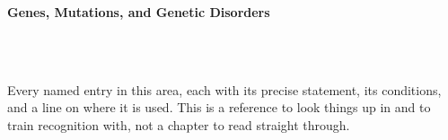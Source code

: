 



\makeindex[title={Index of This Volume},columns=2,intoc]

\begin{titlepage}\thispagestyle{empty}
\vspace*{0.14\textheight}
\noindent{\color{tiercat}\rule{\textwidth}{5pt}}\\[3pt]
\noindent{\color{bioline}\rule{\textwidth}{1pt}}\\[26pt]
\\[12pt]
\noindent\begin{minipage}{\textwidth}\raggedright
{\sffamily\bfseries\fontsize{28}{32}\selectfont\color{bioink}%
 \hyphenchar{} Genes, Mutations, and Genetic Disorders\par}\end{minipage}\\[16pt]
\noindent{\color{biogreen}\rule{\textwidth}{1.4pt}}\\[10pt]
\noindent\begin{minipage}{\textwidth}\raggedright
{\fontsize{10.5}{14}\selectfont\color{biogreen}%
Every named entry in this area, each with its precise statement, its conditions, and a line on
where it is used. This is a reference to look things up in and to train recognition with, not a
chapter to read straight through.\par}\end{minipage}
\vfill
\noindent{\color{bioline}\rule{\textwidth}{1pt}}\\[3pt]
\noindent{\color{tiercat}\rule{\textwidth}{5pt}}
\end{titlepage}
\tableofcontents
\clearpage
{}
\clearpage
\printindex

